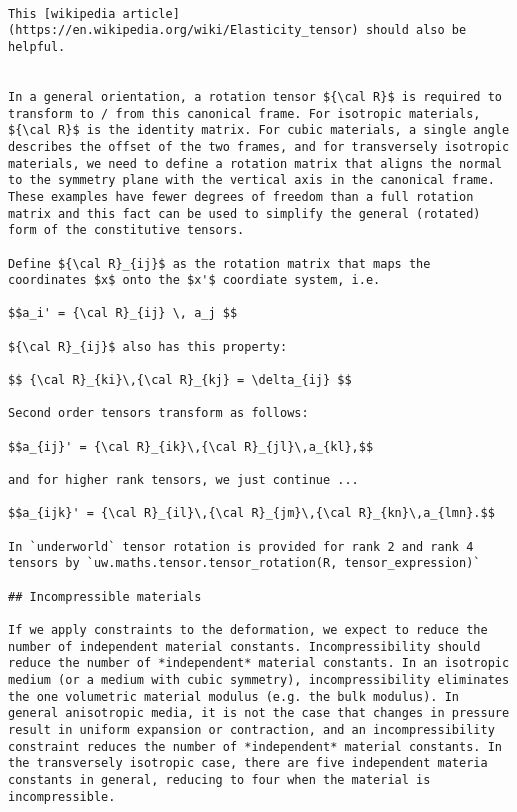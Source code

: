 \documentclass[
  letterpaper,
  DIV=11,
  numbers=noendperiod]{scrreprt}
\begin{document}
\begin{verbatim}

This [wikipedia article](https://en.wikipedia.org/wiki/Elasticity_tensor) should also be helpful.


In a general orientation, a rotation tensor ${\cal R}$ is required to transform to / from this canonical frame. For isotropic materials, ${\cal R}$ is the identity matrix. For cubic materials, a single angle describes the offset of the two frames, and for transversely isotropic materials, we need to define a rotation matrix that aligns the normal to the symmetry plane with the vertical axis in the canonical frame. These examples have fewer degrees of freedom than a full rotation matrix and this fact can be used to simplify the general (rotated) form of the constitutive tensors. 

Define ${\cal R}_{ij}$ as the rotation matrix that maps the coordinates $x$ onto the $x'$ coordiate system, i.e. 

$$a_i' = {\cal R}_{ij} \, a_j $$

${\cal R}_{ij}$ also has this property:

$$ {\cal R}_{ki}\,{\cal R}_{kj} = \delta_{ij} $$

Second order tensors transform as follows:

$$a_{ij}' = {\cal R}_{ik}\,{\cal R}_{jl}\,a_{kl},$$

and for higher rank tensors, we just continue ... 

$$a_{ijk}' = {\cal R}_{il}\,{\cal R}_{jm}\,{\cal R}_{kn}\,a_{lmn}.$$

In `underworld` tensor rotation is provided for rank 2 and rank 4 tensors by `uw.maths.tensor.tensor_rotation(R, tensor_expression)`

## Incompressible materials

If we apply constraints to the deformation, we expect to reduce the number of independent material constants. Incompressibility should reduce the number of *independent* material constants. In an isotropic medium (or a medium with cubic symmetry), incompressibility eliminates the one volumetric material modulus (e.g. the bulk modulus). In general anisotropic media, it is not the case that changes in pressure result in uniform expansion or contraction, and an incompressibility constraint reduces the number of *independent* material constants. In the transversely isotropic case, there are five independent materia constants in general, reducing to four when the material is incompressible. 


\end{verbatim}
\end{document}
